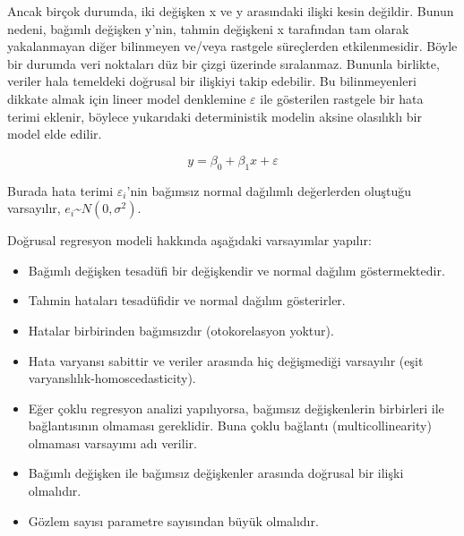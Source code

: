 \documentclass[
  letterpaper,
  DIV=11,
  numbers=noendperiod]{scrreprt}
\begin{document}
Ancak birçok durumda, iki değişken x ve y arasındaki ilişki kesin
değildir. Bunun nedeni, bağımlı değişken y'nin, tahmin değişkeni x
tarafından tam olarak yakalanmayan diğer bilinmeyen ve/veya rastgele
süreçlerden etkilenmesidir. Böyle bir durumda veri noktaları düz bir
çizgi üzerinde sıralanmaz. Bununla birlikte, veriler hala temeldeki
doğrusal bir ilişkiyi takip edebilir. Bu bilinmeyenleri dikkate almak
için lineer model denklemine \(\varepsilon\) ile gösterilen rastgele bir
hata terimi eklenir, böylece yukarıdaki deterministik modelin aksine
olasılıklı bir model elde edilir.

\[ y=\beta_0+\beta_1x+\varepsilon \]

Burada hata terimi \(\varepsilon_i\)'nin bağımsız normal dağılımlı
değerlerden oluştuğu varsayılır,
\(e_i\)\textasciitilde{}\(N(0,\sigma^2)\).

Doğrusal regresyon modeli hakkında aşağıdaki varsayımlar yapılır:

\begin{itemize}
\item
  Bağımlı değişken tesadüfi bir değişkendir ve normal dağılım
  göstermektedir.
\item
  Tahmin hataları tesadüfidir ve normal dağılım gösterirler.
\item
  Hatalar birbirinden bağımsızdır (otokorelasyon yoktur).
\item
  Hata varyansı sabittir ve veriler arasında hiç değişmediği varsayılır
  (eşit varyanslılık-homoscedasticity).
\item
  Eğer çoklu regresyon analizi yapılıyorsa, bağımsız değişkenlerin
  birbirleri ile bağlantısının olmaması gereklidir. Buna çoklu bağlantı
  (multicollinearity) olmaması varsayımı adı verilir.
\item
  Bağımlı değişken ile bağımsız değişkenler arasında doğrusal bir ilişki
  olmalıdır.
\item
  Gözlem sayısı parametre sayısından büyük olmalıdır.
\end{itemize}
\end{document}
